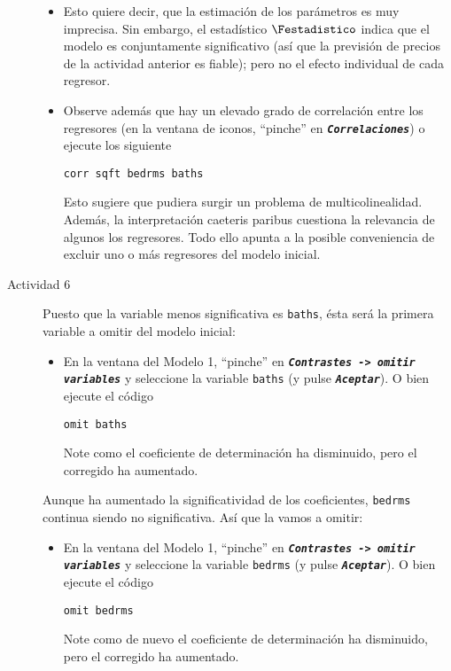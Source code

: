 \documentclass[11pt]{article}
\begin{document}
\begin{description}
\begin{itemize}
\item Esto quiere decir, que la estimación de los parámetros es muy
imprecisa. Sin embargo, el estadístico \(\Festadistico\) indica que
el modelo es conjuntamente significativo (así que la previsión de
precios de la actividad anterior es fiable); pero no el efecto
individual de cada regresor.

\item Observe además que hay un elevado grado de correlación entre los
regresores (en la ventana de iconos, ``pinche'' en
\textbf{\emph{\texttt{Correlaciones}}}) o ejecute los siguiente
\begin{verbatim}
corr sqft bedrms baths
\end{verbatim}
Esto sugiere que pudiera surgir un problema de multicolinealidad.
Además, la interpretación caeteris paribus cuestiona la relevancia
de algunos los regresores. Todo ello apunta a la posible
conveniencia de excluir uno o más regresores del modelo inicial.
\end{itemize}

\item[{Actividad 6}] Puesto que la variable menos significativa es
\texttt{baths}, ésta será la primera variable a omitir del modelo inicial:
\begin{itemize}
\item En la ventana del Modelo 1, ``pinche'' en \textbf{\emph{\texttt{Contrastes ->
    omitir variables}}} y seleccione la variable \texttt{baths} (y pulse
\textbf{\emph{\texttt{Aceptar}}}). O bien ejecute el código
\begin{verbatim}
omit baths
\end{verbatim}
Note como el coeficiente de determinación ha disminuido, pero el
corregido ha aumentado.
\end{itemize}

Aunque ha aumentado la significatividad de los coeficientes,
\texttt{bedrms} continua siendo no significativa. Así que la vamos a
omitir:
\begin{itemize}
\item En la ventana del Modelo 1, ``pinche'' en \textbf{\emph{\texttt{Contrastes ->
    omitir variables}}} y seleccione la variable \texttt{bedrms} (y pulse
\textbf{\emph{\texttt{Aceptar}}}). O bien ejecute el código
\begin{verbatim}
omit bedrms
\end{verbatim}
Note como de nuevo el coeficiente de determinación ha
disminuido, pero el corregido ha aumentado.
\end{itemize}


\end{description}
\end{document}
